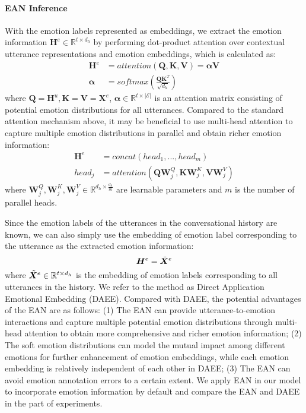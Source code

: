 \documentclass[11pt]{article}
\begin{document}
\paragraph{EAN Inference} With the emotion labels represented as embeddings, we extract the emotion information $\bm{H}^e\in \mathbb{R}^{t\times d_h}$ by performing dot-product attention over contextual utterance representations and emotion embeddings, which is calculated as:
\begin{align}
    \bm{H}^e &= \textit{attention}(\bm{Q},\bm{K},\bm{V}) = \bm{\alpha}\bm{V}\\
    \bm{\alpha} &= \textit{softmax}(\frac{\bm{Q}\bm{K}^T}{\sqrt{d_h}})
\end{align}
where $\bm{Q}=\bm{H}^u, \bm{K}=\bm{V}=\bm{X}^e$, $\bm{\alpha}\in\mathbb{R}^{t\times |\mathcal{E}|}$ is an attention matrix consisting of potential emotion distributions for all utterances. Compared to the standard attention mechanism above, it may be beneficial to use multi-head attention \citep{vaswani2017attention} to capture multiple emotion distributions in parallel and obtain richer emotion information:
\begin{align}
    \bm{H}^e &= \textit{concat}(head_1,...,head_m)\\
    head_j &= \textit{attention}(\bm{Q}\bm{W}^{Q}_j,\bm{K}\bm{W}^K_j,\bm{V}\bm{W}^V_j)
\end{align}
where $\bm{W}^Q_j,\bm{W}^K_j,\bm{W}^V_j\in\mathbb{R}^{d_h\times\frac{d_h}{m}}$ are learnable parameters and $m$ is the number of parallel heads.

Since the emotion labels of the utterances in the conversational history are known, we can also simply use the embedding of emotion label corresponding to the utterance as the extracted emotion information:
\begin{equation}
     \bm{H}^e = \Tilde{\bm{X}}^{e}
\end{equation}
where $\Tilde{\bm{X}}^{e}\in\mathbb{R}^{t\times d_h}$ is the embedding of emotion labels corresponding to all utterances in the history. We refer to the method as Direct Application Emotional Embedding (DAEE). Compared with DAEE, the potential advantages of the EAN are as follows: (1) The EAN can provide utterance-to-emotion interactions and capture multiple potential emotion distributions through multi-head attention to obtain more comprehensive and richer emotion information; (2) The soft emotion distributions can model the mutual impact among different emotions for further enhancement of emotion embeddings, while each emotion embedding is relatively independent of each other in DAEE; (3) The EAN can avoid emotion annotation errors to a certain extent. We apply EAN in our model to incorporate emotion information by default and compare the EAN and DAEE in the part of experiments.
\end{document}
